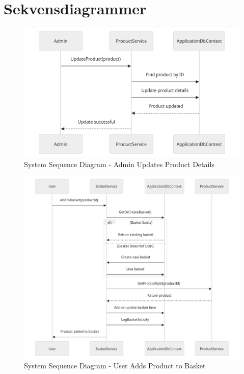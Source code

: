 \section{Sekvensdiagrammer}
\label{appendix:sequence-diagrams}
\begin{figure}
    \centering
    \includegraphics[width=1\textwidth]{figures/diagrams/ssd-admin-updates-product-details.png}
    \caption{System Sequence Diagram - Admin Updates Product Details}
    \label{fig:ssd-admin-updates-product-details}
\end{figure}

\begin{figure}
    \centering
    \includegraphics[width=1\textwidth]{figures/diagrams/ssd-user-adds-product-to-basket.png}
    \caption{System Sequence Diagram - User Adds Product to Basket}
    \label{fig:ssd-user-adds-product-to-basket}
\end{figure}

